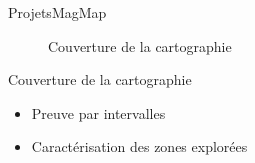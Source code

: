 \begin{frame}{Projets}{MagMap}
\begin{minipage}{0.48\textwidth}
\begin{figure}
            \caption{Couverture de la cartographie}
        \end{figure}
        \begin{block}{Couverture de la cartographie}
            \begin{itemize}
                \item Preuve par intervalles \\
                \item Caractérisation des zones explorées \\
            \end{itemize}
        \end{block}
    \end{minipage}
\end{frame}